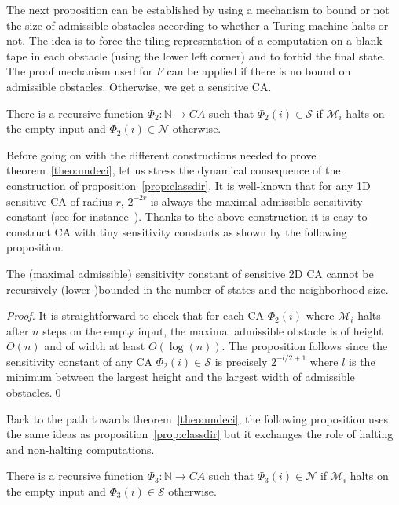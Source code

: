 \documentclass{llncs}
\newcommand{\N}{\mathbb{N}}
\newcommand{\acf}{F}
\newcommand{\sensi}{\mathcal{S}}
\newcommand{\nono}{\mathcal{N}}
\newcommand{\phiclassdir}{\Phi_2}
\newcommand{\phiclassinv}{\Phi_3}
\newcommand{\machine}[1]{\mathcal{M}_{#1}}
\begin{document}
The next proposition can be established by using a mechanism to bound
or not the size of admissible obstacles according to whether a Turing
machine halts or not. The idea is to force the tiling representation
of a computation on a blank tape in each obstacle (using the lower
left corner) and to forbid the final state. The proof mechanism used
for $\acf$ can be applied if there is no bound on admissible
obstacles. Otherwise, we get a sensitive CA.

\begin{proposition}
  \label{prop:classdir}
  There is a recursive function ${\phiclassdir : \N\rightarrow CA}$
  such that ${\phiclassdir(i)\in\sensi}$ if $\machine{i}$ halts on the
  empty input and ${\phiclassdir(i)\in\nono}$ otherwise.
\end{proposition}

Before going on with the different constructions needed to prove
theorem~\ref{theo:undeci}, let us stress the dynamical consequence of
the construction of proposition~\ref{prop:classdir}.  It is well-known
that for any 1D sensitive CA of radius $r$, ${2^{-2r}}$ is always the
maximal admissible sensitivity constant (see for
instance~\cite{Kurka97}). Thanks to the above construction it is easy
to construct CA with tiny sensitivity constants as shown by the
following proposition.

\begin{proposition}
  \label{prop:constant}
  The (maximal admissible) sensitivity constant of sensitive 2D CA
  cannot be recursively (lower-)bounded in the number of states and
  the neighborhood size.
\end{proposition}
\begin{proof}
  It is straightforward to check that for each CA $\phiclassdir(i)$
  where $\machine{i}$ halts after $n$ steps on the empty input, the
  maximal admissible obstacle is of height $O(n)$ and of width at
  least $O(\log(n))$. The proposition follows since the sensitivity
  constant of any CA $\phiclassdir(i)\in\sensi$ is precisely ${2^{-l/2
      + 1}}$ where $l$ is the minimum between the largest height and
  the largest width of admissible obstacles.\qed
\end{proof}

Back to the path towards theorem~\ref{theo:undeci}, the following
proposition uses the same ideas as proposition~\ref{prop:classdir} but
it exchanges the role of halting and non-halting computations.

\begin{proposition}
  \label{prop:classinv}
  There is a recursive function ${\phiclassinv : \N\rightarrow CA}$
  such that ${\phiclassinv(i)\in\nono}$ if $\machine{i}$ halts on the
  empty input and ${\phiclassinv(i)\in\sensi}$ otherwise.
\end{proposition}
\end{document}
